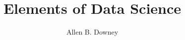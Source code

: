 \newcommand{\thetitle}{Elements of Data Science}
\newcommand{\thesubtitle}{Getting Started with Data Science and Python} 
\newcommand{\theauthors}{Allen B. Downey}
\newcommand{\theversion}{1.0.1}

\title{\thetitle}
\author{\theauthors}

\usepackage[T1]{fontenc}
\usepackage[utf8]{inputenc}
\usepackage{textcomp} %
\usepackage{amssymb,amsmath}
\usepackage[table]{xcolor}

\usepackage{roboto}







\usepackage{setspace}
\usepackage{graphicx}


\makeatletter
{}
\makeatother


\usepackage{bookmark}


\makeatletter
\def\fps@figure{h!}
\makeatother

\usepackage{imakeidx}
\makeindex

\usepackage{upquote}
\usepackage[listings]{tcolorbox}
\newcommand{\passthrough}[1]{#1}


\usepackage{longtable}
\usepackage{booktabs}
\usepackage{calc}             %


\newcommand{\midsepremove}{\aboverulesep=0mm
                           \belowrulesep=0mm}
\midsepremove

